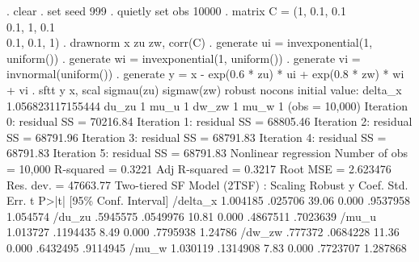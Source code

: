 . clear
{\smallskip}
. set seed 999
{\smallskip}
. quietly set obs 10000
{\smallskip}
. matrix C = (1, 0.1, 0.1 \\ 0.1, 1, 0.1 \\ 0.1, 0.1, 1)
{\smallskip}
. drawnorm x zu zw, corr(C)
{\smallskip}
. generate ui = invexponential(1, uniform())
{\smallskip}
. generate wi = invexponential(1, uniform())
{\smallskip}
. generate vi = invnormal(uniform())
{\smallskip}
. generate y = x - exp(0.6 * zu) * ui + exp(0.8 * zw) * wi + vi
{\smallskip}
. sftt y x, scal sigmau(zu) sigmaw(zw) robust nocons
initial value: delta_x 1.056823117155444 du_zu 1 mu_u 1 dw_zw 1 mu_w 1
(obs = 10,000)
{\smallskip}
Iteration 0:  residual SS =  70216.84
Iteration 1:  residual SS =  68805.46
Iteration 2:  residual SS =  68791.96
Iteration 3:  residual SS =  68791.83
Iteration 4:  residual SS =  68791.83
Iteration 5:  residual SS =  68791.83
{\smallskip}
{\smallskip}
Nonlinear regression                                Number of obs =     10,000
                                                    R-squared     =     0.3221
                                                    Adj R-squared =     0.3217
                                                    Root MSE      =   2.623476
                                                    Res. dev.     =   47663.77
{\smallskip}
Two-tiered SF Model (2TSF) : Scaling
             {\VBAR}               Robust
           y {\VBAR}      Coef.   Std. Err.      t    P>|t|     [95\% Conf. Interval]
    /delta_x {\VBAR}   1.004185    .025706    39.06   0.000     .9537958    1.054574
      /du_zu {\VBAR}   .5945575   .0549976    10.81   0.000     .4867511    .7023639
       /mu_u {\VBAR}   1.013727   .1194435     8.49   0.000     .7795938     1.24786
      /dw_zw {\VBAR}    .777372   .0684228    11.36   0.000     .6432495    .9114945
       /mu_w {\VBAR}   1.030119   .1314908     7.83   0.000     .7723707    1.287868

